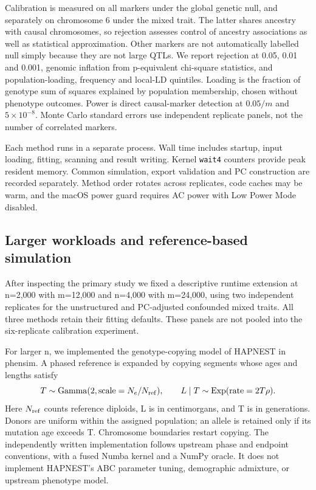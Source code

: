 \documentclass[11pt]{article}
\newcommand{\code}[1]{\texttt{#1}}
\begin{document}
Calibration is measured on all markers under the global genetic null,
and separately on chromosome 6 under the mixed trait. The latter shares
ancestry with causal chromosomes, so rejection assesses control of
ancestry associations as well as statistical approximation. Other markers
are not automatically labelled null simply because they are not large
QTLs. We report rejection at 0.05, 0.01 and 0.001, genomic inflation from
p-equivalent chi-square statistics, and population-loading, frequency and
local-LD quintiles. Loading is the fraction of genotype sum of squares
explained by population membership, chosen without phenotype outcomes.
Power is direct causal-marker detection at $0.05/m$ and $5\times10^{-8}$.
Monte Carlo standard errors use independent replicate panels, not the
number of correlated markers.

Each method runs in a separate process. Wall time includes startup, input
loading, fitting, scanning and result writing. Kernel \code{wait4} counters
provide peak resident memory. Common simulation,
export validation and PC construction are recorded separately. Method
order rotates across replicates, code caches may be warm, and the macOS
power guard requires AC power with Low Power Mode disabled.

\subsection{Larger workloads and reference-based simulation}
\label{sec:hapnest-design}

After inspecting the primary study we fixed a descriptive runtime extension
at n=2,000 with m=12,000 and n=4,000 with m=24,000, using two independent
replicates for the unstructured and PC-adjusted confounded mixed traits.
All three methods retain their fitting defaults. These
panels are not pooled into the six-replicate calibration experiment.

For larger n, we implemented the genotype-copying model of HAPNEST
\citep{wharrie2023} in phensim. A phased reference is expanded by copying
segments whose ages and lengths satisfy
\begin{equation}
 T\sim\operatorname{Gamma}(2,\mathrm{scale}=N_e/N_{\rm ref}),
 \qquad L\mid T\sim\operatorname{Exp}(\mathrm{rate}=2T\rho).
 \label{eq:hapnest}
\end{equation}
Here $N_{\rm ref}$ counts reference diploids, L is in centimorgans, and
T is in generations. Donors are uniform within the assigned population;
an allele is retained only if its mutation age exceeds T. Chromosome
boundaries restart copying. The independently written implementation
follows upstream phase and endpoint conventions, with a fused Numba
kernel and a NumPy oracle. It does not implement HAPNEST's ABC parameter
tuning, demographic admixture, or upstream phenotype model.
\end{document}

